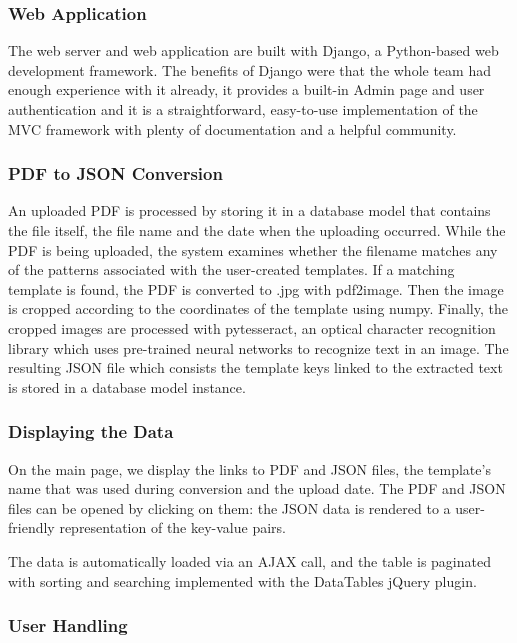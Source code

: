 \documentclass{l3proj}
\begin{document}
\subsubsection{Web Application}

The web server and web application are built with Django, a Python-based web development framework. The benefits of Django were that the whole team had enough experience with it already, it provides a built-in Admin page and user authentication and it is a straightforward, easy-to-use implementation of the MVC framework with plenty of documentation and a helpful community.


\subsubsection{PDF to JSON Conversion}

An uploaded PDF is processed by storing it in a database model that contains the file itself, the file name and the date when the uploading occurred. While the PDF is being uploaded, the system examines whether the filename matches any of the patterns associated with the user-created templates. If a matching template is found, the PDF is converted to .jpg with pdf2image. Then the image is cropped according to the coordinates of the template using numpy. Finally, the cropped images are processed with pytesseract, an optical character recognition library which uses pre-trained neural networks to recognize text in an image. The resulting JSON file which consists the template keys linked to the extracted text is stored in a database model instance.


\subsubsection{Displaying the Data}

On the main page, we display the links to PDF and JSON files, the template’s name that was used during conversion and the upload date. The PDF and JSON files can be opened by clicking on them: the JSON data is rendered to a user-friendly representation of the key-value pairs.

The data is automatically loaded via an AJAX call, and the table is paginated with sorting and searching implemented with the DataTables jQuery plugin.


\subsubsection{User Handling}
\end{document}
